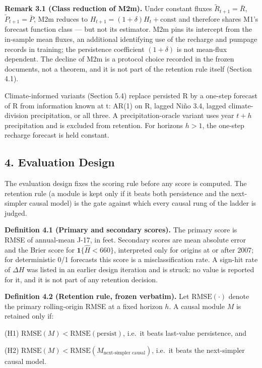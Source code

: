 \documentclass[11pt]{article}
\begin{document}
\textbf{Remark 3.1 (Class reduction of M2m).} Under constant fluxes
\(\tilde R_{t+1}=\bar R\), \(\tilde P_{t+1}=\bar P\), M2m reduces to
\(H_{t+1}=(1+\delta)H_t+\mathrm{const}\) and therefore shares M1's
forecast function class --- but not its estimator. M2m pins its
intercept from the in-sample mean fluxes, an additional identifying use
of the recharge and pumpage records in training; the persistence
coefficient \((1+\delta)\) is not mean-flux dependent. The decline of
M2m is a protocol choice recorded in the frozen documents, not a
theorem, and it is not part of the retention rule itself (Section 4.1).

Climate-informed variants (Section 5.4) replace persisted R by a
one-step forecast of R from information known at t: AR(1) on R, lagged
Ni\~no 3.4, lagged climate-division precipitation, or all three. A
precipitation-oracle variant uses year \(t+h\) precipitation and is
excluded from retention. For horizons \(h>1\), the one-step recharge
forecast is held constant.

\subsection{4. Evaluation Design}\label{evaluation-design}

The evaluation design fixes the scoring rule before any score is
computed. The retention rule (a module is kept only if it beats both
persistence and the next-simpler causal model) is the gate against which
every causal rung of the ladder is judged.

\textbf{Definition 4.1 (Primary and secondary scores).} The primary
score is RMSE of annual-mean J-17, in feet. Secondary scores are mean
absolute error and the Brier score for \(\mathbf{1}\{\hat H < 660\}\),
interpreted only for origins at or after 2007; for deterministic 0/1
forecasts this score is a misclassification rate. A sign-hit rate of
\(\Delta H\) was listed in an earlier design iteration and is struck: no
value is reported for it, and it is not part of any retention decision.

\textbf{Definition 4.2 (Retention rule, frozen verbatim).} Let
\(\mathrm{RMSE}(\cdot)\) denote the primary rolling-origin RMSE at a
fixed horizon \(h\). A causal module \(M\) is retained only if:

(H1) \(\mathrm{RMSE}(M) < \mathrm{RMSE}(\text{persist})\), i.e.~it beats
last-value persistence, and

(H2)
\(\mathrm{RMSE}(M) < \mathrm{RMSE}(M_{\text{next-simpler causal}})\),
i.e.~it beats the next-simpler causal model.
\end{document}

